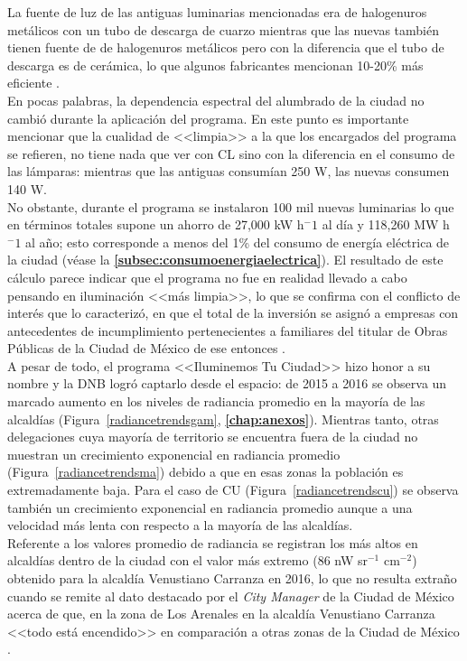 La fuente de luz de las antiguas luminarias mencionadas era de halogenuros metálicos con un tubo de descarga de cuarzo mientras que las nuevas también tienen fuente de de halogenuros metálicos pero con la diferencia que el tubo de descarga es de cerámica, lo que algunos fabricantes mencionan 10-20\% más eficiente \citep{EMB2007}.\\

En pocas palabras, la dependencia espectral del alumbrado de la ciudad no cambió durante la aplicación del programa. En este punto es importante mencionar que la cualidad de <<limpia>> a la que los encargados del programa se refieren, no tiene nada que ver con CL sino con la diferencia en el consumo de las lámparas: mientras que las antiguas consumían 250 W, las nuevas consumen 140 W.\\ 

No obstante, durante el programa se instalaron 100 mil nuevas luminarias lo que en términos totales supone un ahorro de 27,000 kW h$^-1$ al día y 118,260 MW h$^-1$ al año; esto corresponde a menos del 1\% del consumo de energía eléctrica de la ciudad (véase la \textbf{\autoref{subsec:consumoenergiaelectrica}}). El resultado de este cálculo parece indicar que el programa no fue en realidad llevado a cabo pensando en iluminación <<más limpia>>, lo que se confirma con el conflicto de interés que lo caracterizó, en que el total de la inversión se asignó a empresas con antecedentes de incumplimiento pertenecientes a familiares del titular de Obras Públicas de la Ciudad de México de ese entonces \citep{Sinembargo2015}.\\ 

A pesar de todo, el programa <<Iluminemos Tu Ciudad>> hizo honor a su nombre y la DNB logró captarlo desde el espacio: de 2015 a 2016 se observa un marcado aumento en los niveles de radiancia promedio en la mayoría de las alcaldías (Figura~\ref{radiancetrendsgam}, \textbf{\autoref{chap:anexos}}). Mientras tanto, otras delegaciones cuya mayoría de territorio se encuentra fuera de la ciudad no muestran un crecimiento exponencial en radiancia promedio (Figura~\ref{radiancetrendsma}) debido a que en esas zonas la población es extremadamente baja. Para el caso de CU (Figura~\ref{radiancetrendscu}) se observa también un crecimiento exponencial en radiancia promedio aunque a una velocidad más lenta con respecto a la mayoría de las alcaldías.\\ 


Referente a los valores promedio de radiancia se registran los más altos en alcaldías dentro de la ciudad con el valor más extremo (86 nW sr$^{-1}$  cm$^{-2}$) obtenido para la alcaldía Venustiano Carranza en 2016, lo que no resulta extraño cuando se remite al dato destacado por el \textit{City Manager} de la Ciudad de México acerca de que, en la zona de Los Arenales en la alcaldía Venustiano Carranza <<todo está encendido>> en comparación a otras zonas de la Ciudad de México \citep{Universal2017}.\\

